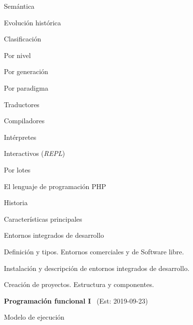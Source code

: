 \begin{longenum}
\begin{longenum}
\begin{longenum}
\begin{longenum}
\begin{longenum}
                \end{longenum}
                \item Semántica
            \end{longenum}
            \item Evolución histórica
            \item Clasificación
            \begin{longenum}
                \item Por nivel
                \item Por generación
                \item Por paradigma
            \end{longenum}
        \end{longenum}
        \item Traductores
        \begin{longenum}
            \item Compiladores
            \item Intérpretes
            \begin{longenum}
                \item Interactivos (\textit{REPL})
                \item Por lotes
            \end{longenum}
        \end{longenum}
        \item El lenguaje de programación PHP
        \begin{longenum}
            \item Historia
            \item Características principales
        \end{longenum}
        \item Entornos integrados de desarrollo
        \begin{longenum}
            \item Definición y tipos. Entornos comerciales y de Software libre.
            \item Instalación y descripción de entornos integrados de desarrollo.
            \item Creación de proyectos. Estructura y componentes.
        \end{longenum}
    \end{longenum}
    \item \textbf{Programación funcional I} \ (Est: 2019-09-23)
    \begin{longenum}
        \item Modelo de ejecución

\end{longenum}
\end{longenum}
